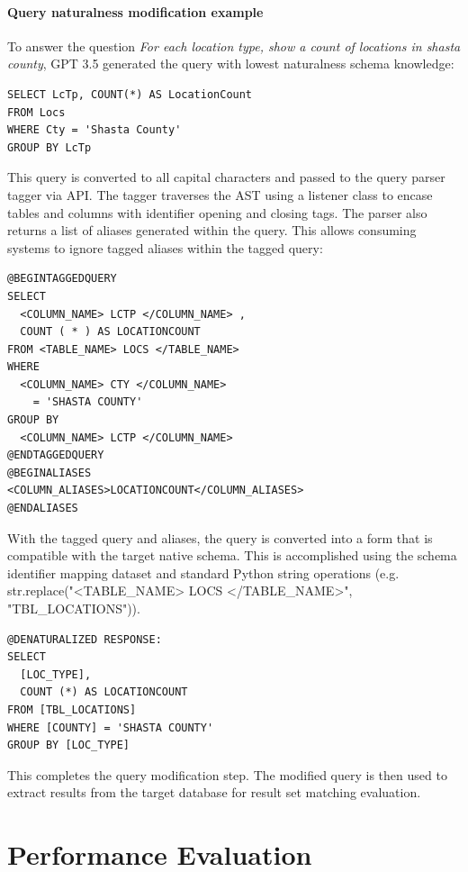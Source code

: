 \paragraph{Query naturalness modification example}

To answer the question \emph{For each location type, show a count of locations in shasta county}, GPT 3.5 generated the query with lowest naturalness schema knowledge:

\begin{verbatim}
SELECT LcTp, COUNT(*) AS LocationCount
FROM Locs
WHERE Cty = 'Shasta County'
GROUP BY LcTp 
\end{verbatim}

This query is converted to all capital characters and passed to the query parser tagger via API.
The tagger traverses the AST using a listener class to encase tables and columns with identifier opening and closing tags. The parser also returns a list of aliases generated within the query.
This allows consuming systems to ignore tagged aliases within the tagged query:

\begin{verbatim}
@BEGINTAGGEDQUERY
SELECT 
  <COLUMN_NAME> LCTP </COLUMN_NAME> , 
  COUNT ( * ) AS LOCATIONCOUNT 
FROM <TABLE_NAME> LOCS </TABLE_NAME> 
WHERE 
  <COLUMN_NAME> CTY </COLUMN_NAME> 
    = 'SHASTA COUNTY' 
GROUP BY 
  <COLUMN_NAME> LCTP </COLUMN_NAME>
@ENDTAGGEDQUERY
@BEGINALIASES
<COLUMN_ALIASES>LOCATIONCOUNT</COLUMN_ALIASES>
@ENDALIASES  
\end{verbatim}

With the tagged query and aliases, the query is converted into a form that is compatible with the target native schema. This is accomplished using the schema identifier mapping dataset and standard Python string operations (e.g. str.replace("<TABLE\_NAME> LOCS </TABLE\_NAME>", "TBL\_LOCATIONS")).

\begin{verbatim}
@DENATURALIZED RESPONSE:
SELECT 
  [LOC_TYPE], 
  COUNT (*) AS LOCATIONCOUNT 
FROM [TBL_LOCATIONS] 
WHERE [COUNTY] = 'SHASTA COUNTY' 
GROUP BY [LOC_TYPE]   
\end{verbatim}

This completes the query modification step.
The modified query is then used to extract results from the target database for result set matching evaluation.




\section{Performance Evaluation}


